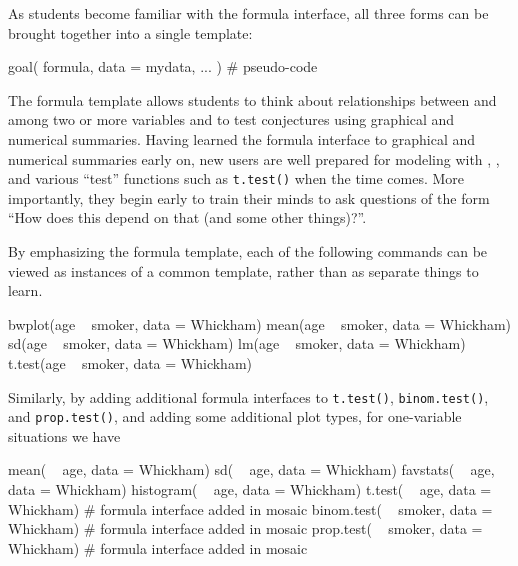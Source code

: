 As students become familiar with the formula interface, all three forms
can be brought together into a single template:

\begin{Schunk}
\begin{Sinput}
goal( formula, data = mydata, ... )      # pseudo-code
\end{Sinput}
\end{Schunk}

\noindent
The formula template allows students to think about relationships
between and among two or more variables and to test conjectures using
graphical and numerical summaries. Having learned the formula interface
to graphical and numerical summaries early on, new users are well
prepared for modeling with , , and various
``test'' functions such as \texttt{t.test()} when the time comes. More
importantly, they begin early to train their minds to ask questions of
the form ``How does this depend on that (and some other things)?''.

By emphasizing the formula template, each of the following commands can
be viewed as instances of a common template, rather than as separate
things to learn.

\begin{Schunk}
\begin{Sinput}
bwplot(age ~ smoker, data = Whickham)
  mean(age ~ smoker, data = Whickham)
    sd(age ~ smoker, data = Whickham)
    lm(age ~ smoker, data = Whickham)
t.test(age ~ smoker, data = Whickham) 
\end{Sinput}
\end{Schunk}

\noindent
Similarly, by adding additional formula interfaces to \texttt{t.test()},
\texttt{binom.test()}, and \texttt{prop.test()}, and adding some
additional plot types, for one-variable situations we have

\begin{Schunk}
\begin{Sinput}
       mean( ~ age, data = Whickham)
         sd( ~ age, data = Whickham)
   favstats( ~ age, data = Whickham)
  histogram( ~ age, data = Whickham)
     t.test( ~ age, data = Whickham)   # formula interface added in mosaic
 binom.test( ~ smoker, data = Whickham)   # formula interface added in mosaic
  prop.test( ~ smoker, data = Whickham)   # formula interface added in mosaic
\end{Sinput}
\end{Schunk}

